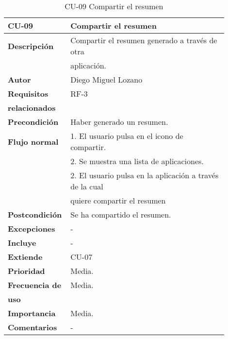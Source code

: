 \begin{longtable}{>{\raggedright}b{0.2\linewidth}>{\raggedright\arraybackslash}b{0.7\linewidth}}
	\toprule
	\textbf{CU-09} & \textbf{Compartir el resumen} \\
	\toprule
	\endhead
	
	\toprule
	\caption{CU-09 Compartir el resumen}
	\endfoot
	
	\small{\textbf{Descripción}} & Compartir el resumen generado a través de otra \\
	& aplicación. \\
	\small{\textbf{Autor}} & Diego Miguel Lozano \\
	\small{\textbf{Requisitos}} & RF-3  \\
	\small{\textbf{relacionados}} & \\
	\small{\textbf{Precondición}} & Haber generado un resumen. \\
	\small{\textbf{Flujo normal}} & \quad \small{1. El usuario pulsa en el icono de compartir.} \\
	& \quad \small{2. Se muestra una lista de aplicaciones.} \\
	& \quad \small{2. El usuario pulsa en la aplicación a través de la cual} \\
	& \qquad \small{quiere compartir el resumen} \\
	\small{\textbf{Postcondición}} & Se ha compartido el resumen. \\
	\small{\textbf{Excepciones}} & - \\
	\small{\textbf{Incluye}} & - \\
	\small{\textbf{Extiende}} & CU-07 \\
	\small{\textbf{Prioridad}} & Media. \\
	\small{\textbf{Frecuencia de}} & Media. \\
	\small{\textbf{uso}} & \\
	\small{\textbf{Importancia}} & Media. \\
	\small{\textbf{Comentarios}} & - \\
\end{longtable}


